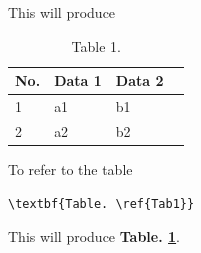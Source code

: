 \noindent This will produce

\begin{table}[!h]
\begin{center}
    \begin{tabular}{ | l | l | l | l |}
    \hline
    \textbf{No.} & \textbf{Data 1} & \textbf{Data 2} \\ \hline
     1 & a1 & b1 \\ \hline
     2 & a2 & b2 \\ \hline
    \end{tabular}
\end{center}
\caption{Table 1.}
\label{Tab1}
\end{table}

\noindent To refer to the table

\begin{verbatim}
\textbf{Table. \ref{Tab1}}
\end{verbatim}

\noindent This will produce \textbf{Table. \ref{Tab1}}.

\cleardoublepage